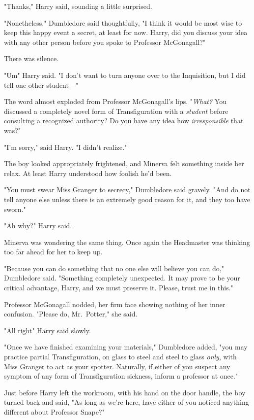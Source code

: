 "Thanks," Harry said, sounding a little surprised.

"Nonetheless," Dumbledore said thoughtfully, "I think it would be most wise to
keep this happy event a secret, at least for now. Harry, did you discuss your
idea with any other person before you spoke to Professor McGonagall?"

There was silence.

"Um{\el}" Harry said. "I don't want to turn anyone over to the Inquisition,
but I did tell one other student\mbox{---}"

The word almost exploded from Professor McGonagall's lips. "\emph{What?} You
discussed a completely novel form of Transfiguration with a \emph{student}
before consulting a recognized authority? Do you have any idea how
\emph{irresponsible} that was?"

"I'm sorry," said Harry. "I didn't realize."

The boy looked appropriately frightened, and Minerva felt something inside her
relax. At least Harry understood how foolish he'd been.

"You must swear Miss Granger to secrecy," Dumbledore said gravely. "And do not
tell anyone else unless there is an extremely good reason for it, and they too
have sworn."

"Ah{\el} why?" Harry said.

Minerva was wondering the same thing. Once again the Headmaster was thinking
too far ahead for her to keep up.

"Because you can do something that no one else will believe you can do,"
Dumbledore said. "Something completely unexpected. It may prove to be your
critical advantage, Harry, and we must preserve it. Please, trust me in this."

Professor McGonagall nodded, her firm face showing nothing of her inner
confusion. "Please do, Mr.~Potter," she said.

"All right{\el}" Harry said slowly.

"Once we have finished examining your materials," Dumbledore added, "you may
practice partial Transfiguration, on glass to steel and steel to glass
\emph{only}, with Miss Granger to act as your spotter. Naturally, if either of
you suspect any symptom of any form of Transfiguration sickness, inform a
professor at once."

Just before Harry left the workroom, with his hand on the door handle, the boy
turned back and said, "As long as we're here, have either of you noticed
anything different about Professor Snape?"

